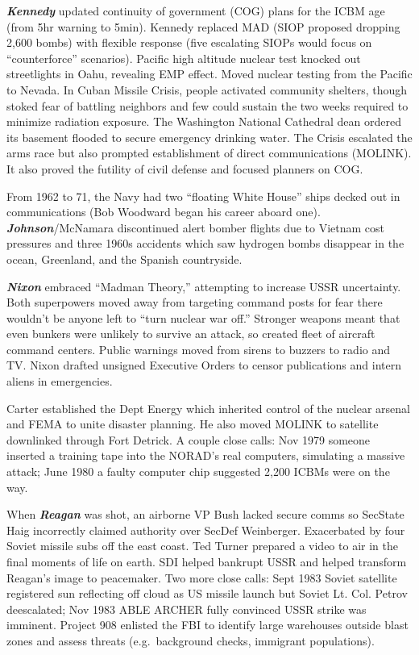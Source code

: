 \documentclass[
]{article}
\begin{document}
\textbf{\emph{Kennedy}} updated continuity of government (COG) plans for
the ICBM age (from 5hr warning to 5min). Kennedy replaced MAD (SIOP
proposed dropping 2,600 bombs) with flexible response (five escalating
SIOPs would focus on ``counterforce'' scenarios). Pacific high altitude
nuclear test knocked out streetlights in Oahu, revealing EMP effect.
Moved nuclear testing from the Pacific to Nevada. In Cuban Missile
Crisis, people activated community shelters, though stoked fear of
battling neighbors and few could sustain the two weeks required to
minimize radiation exposure. The Washington National Cathedral dean
ordered its basement flooded to secure emergency drinking water. The
Crisis escalated the arms race but also prompted establishment of direct
communications (MOLINK). It also proved the futility of civil defense
and focused planners on COG.

From 1962 to 71, the Navy had two ``floating White House'' ships decked
out in communications (Bob Woodward began his career aboard one).
\textbf{\emph{Johnson}}/McNamara discontinued alert bomber flights due
to Vietnam cost pressures and three 1960s accidents which saw hydrogen
bombs disappear in the ocean, Greenland, and the Spanish countryside.

\textbf{\emph{Nixon}} embraced ``Madman Theory,'' attempting to increase
USSR uncertainty. Both superpowers moved away from targeting command
posts for fear there wouldn't be anyone left to ``turn nuclear war
off.'' Stronger weapons meant that even bunkers were unlikely to survive
an attack, so created fleet of aircraft command centers. Public warnings
moved from sirens to buzzers to radio and TV. Nixon drafted unsigned
Executive Orders to censor publications and intern aliens in
emergencies.

Carter established the Dept Energy which inherited control of the
nuclear arsenal and FEMA to unite disaster planning. He also moved
MOLINK to satellite downlinked through Fort Detrick. A couple close
calls: Nov 1979 someone inserted a training tape into the NORAD's real
computers, simulating a massive attack; June 1980 a faulty computer chip
suggested 2,200 ICBMs were on the way.

When \textbf{\emph{Reagan}} was shot, an airborne VP Bush lacked secure
comms so SecState Haig incorrectly claimed authority over SecDef
Weinberger. Exacerbated by four Soviet missile subs off the east coast.
Ted Turner prepared a video to air in the final moments of life on
earth. SDI helped bankrupt USSR and helped transform Reagan's image to
peacemaker. Two more close calls: Sept 1983 Soviet satellite registered
sun reflecting off cloud as US missile launch but Soviet Lt. Col. Petrov
deescalated; Nov 1983 ABLE ARCHER fully convinced USSR strike was
imminent. Project 908 enlisted the FBI to identify large warehouses
outside blast zones and assess threats (e.g.~background checks,
immigrant populations).
\end{document}
